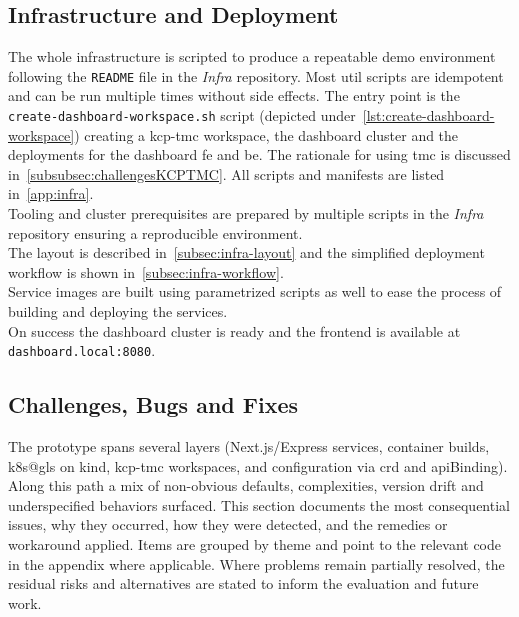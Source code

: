\documentclass[11pt, a4paper, oneside, listof=totoc]{scrartcl}
\begin{document}
        \subsection{Infrastructure and Deployment}\label{subsec:infrastructureAndDeployment}
            The whole infrastructure is scripted to produce a repeatable demo environment following
            the \texttt{README} file in the \textit{Infra} repository.
            Most util scripts are idempotent and can be run multiple times without side effects.
            The entry point is the \texttt{create-dashboard-workspace.sh} script
            (depicted under~\autoref{lst:create-dashboard-workspace}) creating a \gls{kcp}-\gls{tmc}
            workspace, the dashboard cluster and the deployments for the dashboard \gls{fe} and
            \gls{be}.
            The rationale for using \gls{tmc} is discussed in~\autoref{subsubsec:challengesKCPTMC}.
            All scripts and manifests are listed in~\autoref{app:infra}.\\
            Tooling and cluster prerequisites are prepared by multiple scripts in the \textit{Infra}
            repository ensuring a reproducible environment.\\
            The layout is described in~\autoref{subsec:infra-layout} and the simplified deployment
            workflow is shown in~\autoref{subsec:infra-workflow}.\\
            Service images are built using parametrized scripts as well to ease the process of
            building and deploying the services.\\
            On success the dashboard cluster is ready and the frontend is available at
            \texttt{dashboard.local:8080}.

        \subsection{Challenges, Bugs and Fixes}\label{subsec:challengesAndBugs}
            The prototype spans several layers (Next.js/Express services, container builds,
            \gls{k8s@gls} on \gls{kind}, \gls{kcp}-\gls{tmc} workspaces, and configuration via
            \gls{crd} and \gls{api}Binding).
            Along this path a mix of non-obvious defaults, complexities, version drift and
            underspecified behaviors surfaced.
            This section documents the most consequential issues, why they occurred, how they were
            detected, and the remedies or workaround applied.
            Items are grouped by theme and point to the relevant code in the appendix where
            applicable.
            Where problems remain partially resolved, the residual risks and alternatives are stated
            to inform the evaluation and future work.
\end{document}
